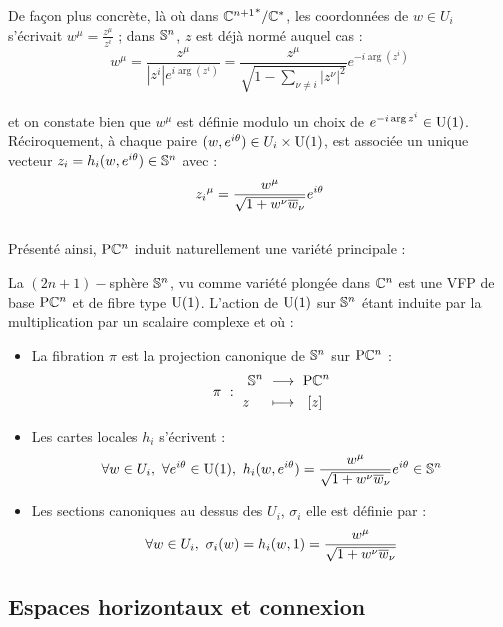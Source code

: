 De façon plus concrète, là où dans ${\C^{n+1}}^*/\C^*$, les coordonnées de $w\in U_i$ s'écrivait $w^\mu = \frac{z^\mu}{z^i}$ ; dans $\S{n}$, $z$ est déjà normé auquel cas :
\[w^\mu = \frac{z^\mu}{|z^i|e^{i\arg (z^i)}} = \frac{z^{\mu}}{\sqrt{1-\sum_{\nu\neq i}|z^\nu|^2}}e^{-i\arg(z^i)}\]
\\
et on constate bien que $w^\mu$ est définie modulo un choix de $e^{-i\arg z^i}\in \U{1}$. Réciroquement, à chaque paire $(w,e^{i\theta})\in U_i\times \U{1}$, est associée un unique vecteur $z_i = h_i(w,e^{i\theta})\in\S{n}$ avec :
\[{z_i}^\mu = \frac{w^\mu}{\sqrt{1 + w^\nu \congu{w}_\nu}}e^{i\theta}\]
\\

Présenté ainsi, $\PC{n}$ induit naturellement une variété principale :
\begin{proposition}
	La $(2n+1)-$sphère $\S{n}$, vu comme variété plongée dans $\C^n$ est une VFP de base $\PC{n}$ et de fibre type $\U{1}$. L'action de $\U{1}$ sur $\S{n}$ étant induite par la multiplication par un scalaire complexe et où :
	\begin{itemize}
		\item La fibration $\pi$ est la projection canonique de $\S{n}$ sur $\PC{n}$ :
		\begin{equation}
			\pi\ :\ \begin{aligned} \S{n}\ &\lr\ \PC{n} \\ z\quad\ &\lmt\ \ [z]\end{aligned}
		\end{equation}
		
		\item Les cartes locales $h_i$ s'écrivent :
		\begin{equation}
			\forall w \in U_i,\ \forall e^{i\theta}\in\U{1},\  h_i(w,e^{i\theta}) = \frac{w^\mu}{\sqrt{1 + w^\nu \congu{w}_\nu}}e^{i\theta} \in \S{n}
		\end{equation}
		
		\item Les sections canoniques au dessus des $U_i$, $\sigma_i$ elle est définie par :
		\begin{equation}
			\forall w \in U_i,\ \sigma_i(w) = h_i(w, 1) = \frac{w^\mu}{\sqrt{1 + w^\nu \congu{w}_\nu}}
		\end{equation}
		
	\end{itemize}
\end{proposition}
\skipl




\subsection{Espaces horizontaux et connexion}\label{subsec:connexion2VFP}

